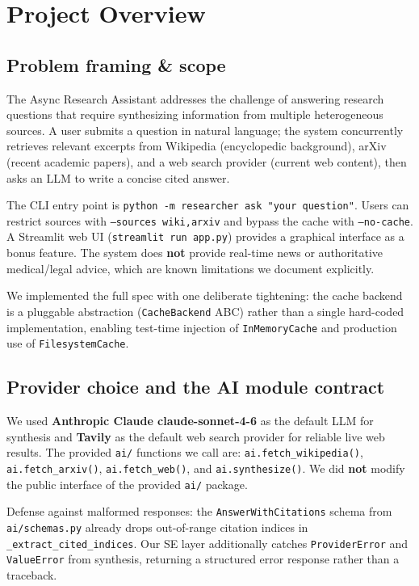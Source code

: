 \documentclass[11pt,a4paper]{article}
\begin{document}
\section{Project Overview}

\subsection{Problem framing \& scope}

The Async Research Assistant addresses the challenge of answering research questions that require synthesizing information from multiple heterogeneous sources. A user submits a question in natural language; the system concurrently retrieves relevant excerpts from Wikipedia (encyclopedic background), arXiv (recent academic papers), and a web search provider (current web content), then asks an LLM to write a concise cited answer.

The CLI entry point is \texttt{python -m researcher ask "your question"}. Users can restrict sources with \texttt{--sources wiki,arxiv} and bypass the cache with \texttt{--no-cache}. A Streamlit web UI (\texttt{streamlit run app.py}) provides a graphical interface as a bonus feature. The system does \textbf{not} provide real-time news or authoritative medical/legal advice, which are known limitations we document explicitly.

We implemented the full spec with one deliberate tightening: the cache backend is a pluggable abstraction (\texttt{CacheBackend} ABC) rather than a single hard-coded implementation, enabling test-time injection of \texttt{InMemoryCache} and production use of \texttt{FilesystemCache}.

\subsection{Provider choice and the AI module contract}

We used \textbf{Anthropic Claude claude-sonnet-4-6} as the default LLM for synthesis and \textbf{Tavily} as the default web search provider for reliable live web results. The provided \texttt{ai/} functions we call are: \texttt{ai.fetch\_wikipedia()}, \texttt{ai.fetch\_arxiv()}, \texttt{ai.fetch\_web()}, and \texttt{ai.synthesize()}. We did \textbf{not} modify the public interface of the provided \texttt{ai/} package.

Defense against malformed responses: the \texttt{AnswerWithCitations} schema from \texttt{ai/schemas.py} already drops out-of-range citation indices in \texttt{\_extract\_cited\_indices}. Our SE layer additionally catches \texttt{ProviderError} and \texttt{ValueError} from synthesis, returning a structured error response rather than a traceback.
\end{document}
